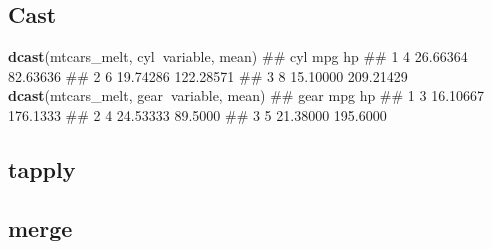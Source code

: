 \documentclass[]{article}
\newenvironment{Shaded}{\begin{snugshade}}{\end{snugshade}}
\newcommand{\KeywordTok}[1]{\textcolor[rgb]{0.13,0.29,0.53}{\textbf{#1}}}
\newcommand{\OperatorTok}[1]{\textcolor[rgb]{0.81,0.36,0.00}{\textbf{#1}}}
\newcommand{\NormalTok}[1]{#1}
\begin{document}
\subsection{Cast}\label{cast-1}

\begin{Shaded}
\begin{Highlighting}[]
\KeywordTok{dcast}\NormalTok{(mtcars_melt, cyl}\OperatorTok{~}\NormalTok{variable, mean)}
\NormalTok{##   cyl      mpg        hp}
\NormalTok{## 1   4 26.66364  82.63636}
\NormalTok{## 2   6 19.74286 122.28571}
\NormalTok{## 3   8 15.10000 209.21429}
\KeywordTok{dcast}\NormalTok{(mtcars_melt, gear}\OperatorTok{~}\NormalTok{variable, mean)}
\NormalTok{##   gear      mpg       hp}
\NormalTok{## 1    3 16.10667 176.1333}
\NormalTok{## 2    4 24.53333  89.5000}
\NormalTok{## 3    5 21.38000 195.6000}
\end{Highlighting}
\end{Shaded}

\subsection{tapply}\label{tapply}

\begin{Shaded}
\end{Shaded}

\subsection{merge}\label{merge}
\end{document}
